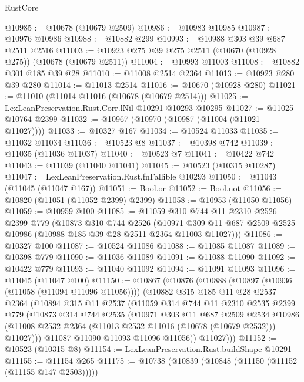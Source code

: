 \begin{lexlean}{RustCore}
\begin{coremodule}
@10985 := @10678 (@10679 @2509)
@10986 := @10983 @10985
@10987 := @10976 @10986
@10988 := @10882 @299
@10993 := @10988 @303 @39 @687 @2511 @2516
@11003 := @10923 @275 @39 @275 @2511 (@10670 (@10928 @275)) (@10678 (@10679 @2511))
@11004 := @10993 @11003
@11008 := @10882 @301 @185 @39 @28
@11010 := @11008 @2514 @2364
@11013 := @10923 @280 @39 @280
@11014 := @11013 @2514
@11016 := @10670 (@10928 @280)
@11021 := @11010 (@11014 @11016 (@10678 (@10679 @2514)))
@11025 := LexLeanPreservation.Rust.Corr.lNil @10291 @10293 @10295
@11027 := @11025 @10764 @2399
@11032 := @10967 (@10970 (@10987 (@11004 (@11021 @11027))))
@11033 := @10327 @167
@11034 := @10524 @11033
@11035 := @11032 @11034
@11036 := @10523 @8
@11037 := @10398 @742
@11039 := @11035 (@11036 @11037)
@11040 := @10523 @7
@11041 := @10422 @742
@11043 := @11039 (@11040 @11041)
@11045 := @10523 (@10315 @10287)
@11047 := LexLeanPreservation.Rust.fnFallible @10293
@11050 := @11043 (@11045 (@11047 @167))
@11051 := Bool.or
@11052 := Bool.not
@11056 := @10820 (@11051 (@11052 @2399) @2399)
@11058 := @10953 (@11050 @11056)
@11059 := @10959 @100
@11085 := @11059
    @310
    @744
    @11
    @2310
    @2526
    @2399
    @779
    (@10873
      @310
      @744
      @2526
      (@10971 @309 @11 @687 @2509 @2525 @10986 (@10988 @185 @39 @28 @2511 @2364 @11003 @11027)))
@11086 := @10327 @100
@11087 := @10524 @11086
@11088 := @11085 @11087
@11089 := @10398 @779
@11090 := @11036 @11089
@11091 := @11088 @11090
@11092 := @10422 @779
@11093 := @11040 @11092
@11094 := @11091 @11093
@11096 := @11045 (@11047 @100)
@11150 := @10867
    (@10876
      (@10888
        (@10897 (@10936 (@11058 (@11094 @11096 @11056))))
        (@10882
          @315
          @185
          @11
          @28
          @2537
          @2364
          (@10894
            @315
            @11
            @2537
            (@11059
              @314
              @744
              @11
              @2310
              @2535
              @2399
              @779
              (@10873
                @314
                @744
                @2535
                (@10971
                  @303
                  @11
                  @687
                  @2509
                  @2534
                  @10986
                  (@11008 @2532 @2364 (@11013 @2532 @11016 (@10678 (@10679 @2532))) @11027)))
              @11087
              @11090
              @11093
              @11096
              @11056))
          @11027)))
@11152 := @10523 (@10315 @8)
@11154 := LexLeanPreservation.Rust.buildShape @10291
@11155 := @11154 @265
@11175 := @10738
    (@10839 (@10848 (@11150 (@11152 (@11155 @147 @2503)))))

\end{coremodule}
\end{lexlean}

